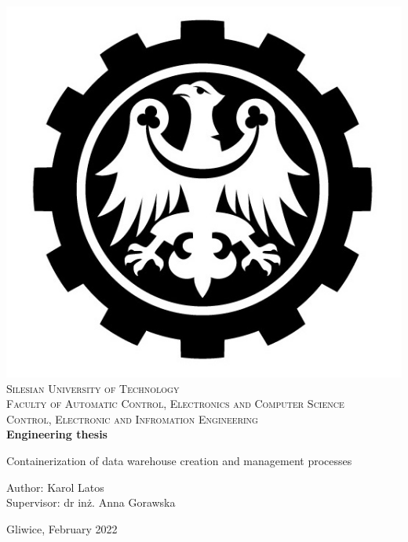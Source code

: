 \newpage \vspace{-5cm}
\thispagestyle{empty}


\begin{onehalfspacing}
\begin{center}

\centering
\includegraphics[keepaspectratio, scale=0.5]{./figures/polsl_eng_notext.jpg} \\[.8cm]

{\fontsize{17.28}{16}\selectfont
\textsc{Silesian University of Technology\\[.3cm]
Faculty of Automatic Control, Electronics and Computer Science \\[.8cm]
Control, Electronic and Infromation Engineering \\[2cm]}
\textbf{Engineering thesis}\\[1.6cm]}

\LARGE{Containerization of data warehouse creation and management processes} \\[2.4cm]

\large
\begin{flushleft}
Author: Karol Latos  \\
Supervisor: dr inż. Anna Gorawska \\
\end{flushleft}

\vspace*{\fill}
Gliwice, February 2022
\end{center}
\end{onehalfspacing}


\newpage
\thispagestyle{empty}
\mbox{}
\clearpage

\setcounter{page}{0}
\tableofcontents

\pagestyle{fancy}
